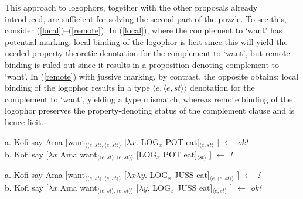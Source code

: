 \documentclass[output=paper
,modfonts
,nonflat]{langsci/langscibook}
\newcommand{\á}{\'{ã}}
\newcommand{\É}{\'{\~{ε}}}
\newcommand{\È}{\`{\~{ε}}}
\newcommand{\í}{\'{\~{i}}}
\newcommand{\ì}{\`{\~{i}}}
\newcommand{\Ó}{\'{\~{ɔ}}}
\newcommand{\Ò}{\`{\~{ɔ}}}
\newcommand{\ú}{\'{ũ}}
\newcommand{\ù}{\`{ũ}}
\begin{document}
This approach to logophors, together with the other proposals already introduced, are sufficient for solving the second part of the puzzle. To see this, consider (\ref{local})--(\ref{remote}). In (\ref{local}), where the complement to `want' has potential marking, local binding of the logophor is licit since this will yield the needed property-theoretic denotation for the complement to `want', but remote binding is ruled out since it results in a proposition-denoting complement to `want'. In (\ref{remote}) with jussive marking, by contrast, the opposite obtains: local binding of the logophor results in a type $\langle e,\langle e,st\rangle\rangle$ denotation for the complement to `want', yielding a type mismatch, whereas remote binding of the logophor preserves the property-denoting status of the complement clause and is hence licit. 


\ea 
a. Kofi  say Ama [want$_{\langle\langle e,st\rangle,\langle e,st\rangle\rangle}$ [$\lambda x$. LOG$_{x}$ POT eat]$_{\langle e,st\rangle}$ ] \hfill $\leftarrow$ {\em ok!}\\
b. Kofi  say [$\lambda x$.Ama want$_{\langle\langle e,st\rangle,\langle e,st\rangle\rangle}$ [LOG$_{x}$ POT eat]$_{\langle st\rangle}$ ] \hfill $\leftarrow$ {\em *!} \label{local}
\z

\ea 
a. Kofi  say Ama [want$_{\langle\langle e,st\rangle,\langle e,st\rangle\rangle}$ [$\lambda x\lambda y$. LOG$_{x}$ JUSS eat]$_{\langle e,\langle e,st\rangle\rangle}$ ] \hfill $\leftarrow$ {\em *!}\\
b. Kofi  say [$\lambda x$.Ama want$_{\langle\langle e,st\rangle,\langle e,st\rangle\rangle}$ [$\lambda y$. LOG$_{x}$ JUSS eat]$_{\langle e,st\rangle}$ ] \hfill $\leftarrow$ {\em ok!} \label{remote}
\z
\end{document}
